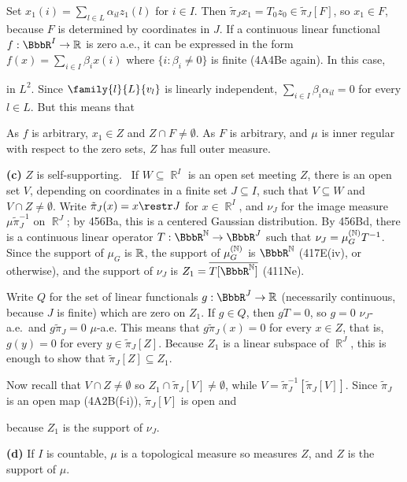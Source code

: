 {Set $x_1(i)=\sum_{l\in L}\alpha_{il}z_1(l)$ for $i\in I$.   Then
$\tilde\pi_Jx_1=T_0z_0\in\tilde\pi_J[F]$, so $x_1\in F$, because $F$ is
determined by coordinates in $J$.   If a continuous linear functional
$f:\BbbR^I\to\Bbb R$ is zero a.e., it can be expressed in the form
$f(x)=\sum_{i\in I}\beta_ix(i)$ where $\{i:\beta_i\ne 0\}$ is finite
(4A4Be again).   In this case,


\noindent in $L^2$.   Since $\family{l}{L}{v_l}$ is linearly
independent, $\sum_{i\in I}\beta_i\alpha_{il}=0$ for every $l\in L$.
But this means that


\noindent As $f$ is arbitrary, $x_1\in Z$ and $Z\cap F\ne\emptyset$.
As $F$ is arbitrary, and $\mu$ is inner regular with respect to the zero
sets, $Z$ has full outer measure.\ \Qed

\medskip

{\bf (c)} $Z$ is self-supporting.   \Prf\ If $W\subseteq\BbbR^I$ is an
open set meeting $Z$, there is an open set $V$, depending on coordinates
in a finite set $J\subseteq I$, such that $V\subseteq W$ and
$V\cap Z\ne\emptyset$.   Write $\tilde\pi_J(x)=x\restr J$ for
$x\in\BbbR^I$, and $\nu_J$ for the image measure $\mu\tilde\pi_J^{-1}$
on $\BbbR^J$;  by 456Ba, this is a centered Gaussian distribution.   By
456Bd, there is a continuous linear operator $T:\BbbR^{\Bbb
N}\to\BbbR^J$ such that $\nu_J=\mu_G^{(\Bbb N)}T^{-1}$.   Since the
support of $\mu_G$ is
$\Bbb R$, the support of $\mu_G^{(\Bbb N)}$ is $\BbbR^{\Bbb N}$
(417E(iv), or otherwise), and the support of $\nu_J$ is
$Z_1=\overline{T[\BbbR^{\Bbb N}]}$ (411Ne).

Write $Q$ for the set of linear functionals $g:\BbbR^J\to\Bbb R$
(necessarily continuous, because $J$ is finite) which
are zero on $Z_1$.   If $g\in Q$, then $gT=0$, so $g=0\,\,\nu_J$-a.e.\
and $g\tilde\pi_J=0\,\,\mu$-a.e.   This means that $g\tilde\pi_J(x)=0$
for every $x\in Z$, that is, $g(y)=0$ for every $y\in\tilde\pi_J[Z]$.
Because $Z_1$ is a linear subspace of $\BbbR^J$, this is enough to show
that $\tilde\pi_J[Z]\subseteq Z_1$.

Now recall that $V\cap Z\ne\emptyset$ so
$Z_1\cap\tilde\pi_J[V]\ne\emptyset$, while
$V=\tilde\pi_J^{-1}[\tilde\pi_J[V]]$.   Since $\tilde\pi_J$ is an open
map (4A2B(f-i)), $\tilde\pi_J[V]$ is open and


\noindent because $Z_1$ is the support of $\nu_J$.
\Qed

\medskip

{\bf (d)} If $I$ is countable, $\mu$ is a topological measure so
measures $Z$, and $Z$ is the support of $\mu$.
}%

